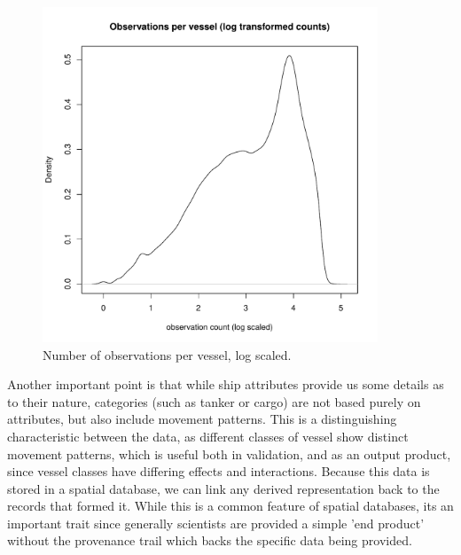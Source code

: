 \begin{figure}[htbp]
  \centering
  \includegraphics[width=100mm]{figures/obs-per-vessel-log.pdf}
  \caption{Number of observations per vessel, log scaled.}
  \label{fig:obs-per-vessel-log}
\end{figure}





Another important point is that while ship attributes provide us some details as to their nature, categories (such as tanker or cargo) are not based purely on attributes, but also include movement patterns. This is a distinguishing characteristic between the data, as different classes of vessel show distinct movement patterns, which is useful both in validation, and as an output product, since vessel classes have differing effects and interactions. Because this data is stored in a spatial database, we can link any derived representation back to the records that formed it. While this is a common feature of spatial databases, its an important trait since generally scientists are provided a simple 'end product' without the provenance trail which backs the specific data being provided.

